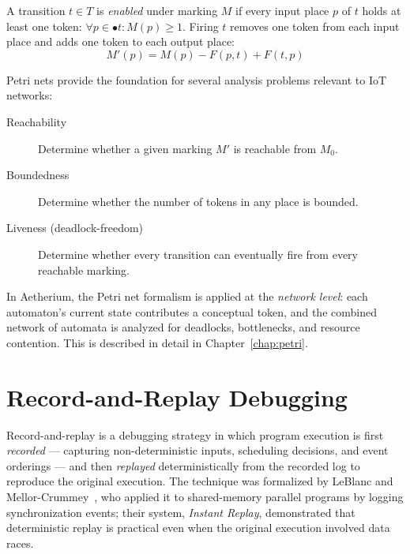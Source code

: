 A transition $t \in T$ is \textit{enabled} under marking $M$ if every input place $p$ of $t$ holds at least one token: $\forall p \in \bullet t : M(p) \geq 1$. Firing $t$ removes one token from each input place and adds one token to each output place:
\begin{equation}
  M'(p) = M(p) - F(p,t) + F(t,p)
\end{equation}

Petri nets provide the foundation for several analysis problems relevant to IoT networks:
\begin{description}
  \item[Reachability] Determine whether a given marking $M'$ is reachable from $M_0$.
  \item[Boundedness] Determine whether the number of tokens in any place is bounded.
  \item[Liveness (deadlock-freedom)] Determine whether every transition can eventually fire from every reachable marking.
\end{description}

In Aetherium, the Petri net formalism is applied at the \textit{network level}: each automaton's current state contributes a conceptual token, and the combined network of automata is analyzed for deadlocks, bottlenecks, and resource contention. This is described in detail in Chapter~\ref{chap:petri}.

\section{Record-and-Replay Debugging}
\label{sec:rr-background}

Record-and-replay is a debugging strategy in which program execution is first
\textit{recorded} --- capturing non-deterministic inputs, scheduling decisions, and event
orderings --- and then \textit{replayed} deterministically from the recorded log to
reproduce the original execution.  The technique was formalized by LeBlanc and
Mellor-Crummey~\cite{LeBlanc1987}, who applied it to shared-memory parallel programs by
logging synchronization events; their system, \textit{Instant Replay}, demonstrated that
deterministic replay is practical even when the original execution involved data races.

